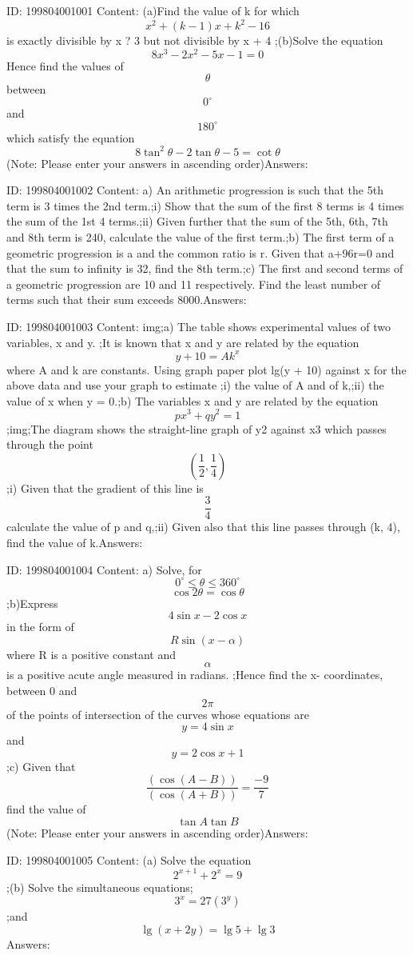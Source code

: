 \documentclass{article}
\begin{document}
ID: 199804001001
Content:
(a)Find the value of k for which \[x^2+(k-1)x+k^2-16\] is exactly divisible by x ? 3 but not divisible by x + 4 ;(b)Solve the equation \[8x^3-2x^2-5x-1=0\]  Hence find the values of \[\theta\] between \[0^{\circ}\]  and \[180^{\circ}\]  which satisfy the equation \[8\tan^2\theta-2\tan\theta-5=\cot\theta\](Note: Please enter your answers in ascending order)Answers:

ID: 199804001002
Content:
a) An arithmetic progression is such that the 5th term is 3 times the 2nd term.;i) Show that the sum of the first 8 terms is 4 times the sum of the 1st 4 terms.;ii) Given further that the sum of the 5th, 6th, 7th and 8th term is 240, calculate the value of the first term.;b) The first term of a geometric progression is a and the common ratio is r. Given that a+96r=0 and that the sum to infinity is 32, find the 8th term.;c) The first and second terms of a geometric progression are 10 and 11 respectively. Find the least number of terms such that their sum exceeds 8000.Answers:

ID: 199804001003
Content:
img;a) The table shows experimental values of two variables, x and y.  ;It is known that x and y are related by the equation \[y+10=Ak^x\] where A and k are constants. Using graph paper plot lg(y + 10) against x for the above data and use your graph to estimate ;i) the value of A and of k,;ii) the value of x when y = 0.;b) The variables x and y are related by the equation \[px^3+qy^2=1\];img;The diagram shows the straight-line graph of y2 against x3 which passes through the point \[(\frac{1}{2},\frac{1}{4})\] ;i) Given that the gradient of this line is \[\frac{3}{4}\] calculate the value of p and q,;ii) Given also that this line passes through (k, 4), find the value of k.Answers:

ID: 199804001004
Content:
a) Solve, for \[0^{\circ}\leq \theta\leq 360^{\circ}\] \[\cos2\theta=\cos\theta\] ;b)Express \[4\sin x - 2\cos x\] in the form of \[R\sin(x - \alpha)\] where R is a positive constant and \[\alpha\] is a positive acute angle measured in radians. ;Hence find the x- coordinates, between 0 and \[2\pi\] of the points of intersection of the curves whose equations are \[y = 4\sin x\] and \[y = 2\cos x + 1\];c) Given that \[\frac{(\cos(A-B))}{(\cos(A+B))}=\frac{-9}{7}\] find the value of \[\tan A\tan B\] (Note: Please enter your answers in ascending order)Answers:

ID: 199804001005
Content:
(a) Solve the equation \[2^{x+1}+2^x=9\] ;(b) Solve the simultaneous equations;\[3^x=27(3^y)\];and \[\lg(x+2y)=\lg5+\lg3\]Answers:
\end{document}
